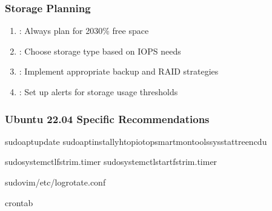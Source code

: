 \documentclass[letterpaper,10pt,english]{sphinxmanual}
\begin{document}
\subsubsection{Storage Planning}
\label{\detokenize{storage-overview:storage-planning}}\begin{enumerate}
%
\item {} 
\sphinxAtStartPar
{}: Always plan for 20\sphinxhyphen{}30\% free space

\item {} 
\sphinxAtStartPar
{}: Choose storage type based on IOPS needs

\item {} 
\sphinxAtStartPar
{}: Implement appropriate backup and RAID strategies

\item {} 
\sphinxAtStartPar
{}: Set up alerts for storage usage thresholds

\end{enumerate}


\subsubsection{Ubuntu 22.04 Specific Recommendations}
\label{\detokenize{storage-overview:ubuntu-22-04-specific-recommendations}}
\begin{sphinxVerbatim}[commandchars=\\\{\}]
sudoaptupdate
sudoaptinstall\PYGZhy{}yhtopiotopsmartmontoolssysstattreencdu

sudosystemctlfstrim.timer
sudosystemctlstartfstrim.timer

sudovim/etc/logrotate.conf

crontab\PYGZhy{}
\end{sphinxVerbatim}
\end{document}
